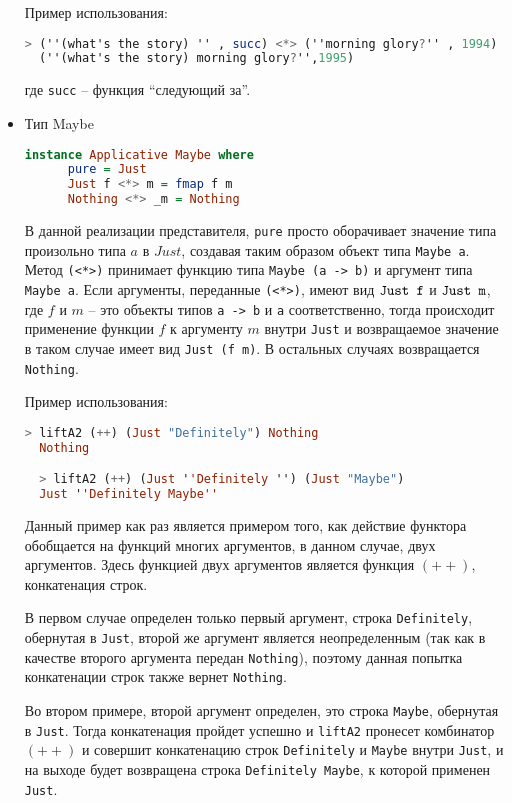 \begin{itemize}
  Пример использования:
  \begin{lstlisting}[language=Haskell]
  > (''(what's the story) '' , succ) <*> (''morning glory?'' , 1994)
  (''(what's the story) morning glory?'',1995)
  \end{lstlisting}
  где \verb"succ" -- функция ``следующий за''.

  \item Тип Maybe
  \begin{lstlisting}[language=Haskell]
    instance Applicative Maybe where
      pure = Just
      Just f <*> m = fmap f m
      Nothing <*> _m = Nothing
  \end{lstlisting}

  В данной реализации представителя, \verb"pure" просто оборачивает значение типа произольно типа $a$ в $Just$,
  создавая таким образом объект типа \verb"Maybe a". Метод \verb"(<*>)" принимает функцию типа \verb"Maybe (a -> b)" и
  аргумент типа \verb"Maybe a". Если аргументы, переданные \verb"(<*>)", имеют вид $\verb"Just f"$ и $\verb"Just m"$,
  где $f$ и $m$ -- это объекты типов \verb"a -> b" и \verb"a" соответственно, тогда происходит применение функции $f$
  к аргументу $m$ внутри \verb"Just" и возвращаемое значение в таком случае имеет вид \verb"Just (f m)".
  В остальных случаях возвращается \verb"Nothing".

  Пример использования:
  \begin{lstlisting}[language=Haskell]
  > liftA2 (++) (Just "Definitely") Nothing
  Nothing

  > liftA2 (++) (Just ''Definitely '') (Just "Maybe")
  Just ''Definitely Maybe''
  \end{lstlisting}

Данный пример как раз является примером того, как действие функтора обобщается на функций многих аргументов,
в данном случае, двух аргументов. Здесь функцией двух аргументов является функция $(++)$, конкатенация строк.

В первом случае определен только первый аргумент, строка \verb"Definitely", обернутая в \verb"Just",
второй же аргумент является неопределенным (так как в качестве второго аргумента передан \verb"Nothing"),
поэтому данная попытка конкатенации строк также вернет \verb"Nothing".

Во втором примере, второй аргумент определен, это строка \verb"Maybe", обернутая в \verb"Just".
Тогда конкатенация пройдет успешно и \verb"liftA2" пронесет комбинатор $(++)$ и совершит конкатенацию строк
\verb"Definitely" и \verb"Maybe" внутри \verb"Just", и на выходе будет возвращена строка \verb"Definitely Maybe",
к которой применен \verb"Just".
\end{itemize}
